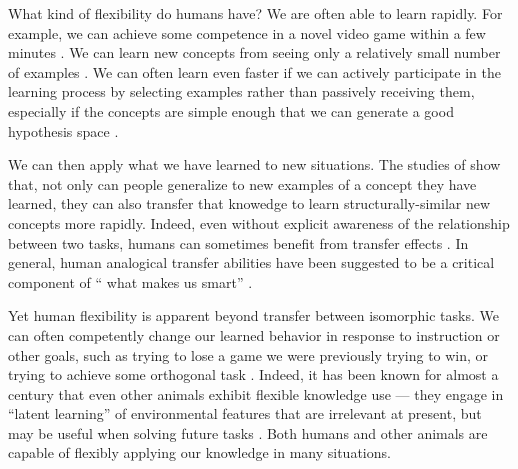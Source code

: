 What kind of flexibility do humans have? We are often able to learn rapidly. For example, we can achieve some competence in a novel video game within a few minutes \citep{Lake2016}. We can learn new concepts from seeing only a relatively small number of examples \citep[e.g.][]{Bourne1970}. We can often learn even faster if we can actively participate in the learning process by selecting examples rather than passively receiving them, especially if the concepts are simple enough that we can generate a good hypothesis space \citep{Markant2014a}. \par
We can then apply what we have learned to new situations. The studies of \citet{Bourne1970} show that, not only can people generalize to new examples of a concept they have learned, they can also transfer that knowedge to learn structurally-similar new concepts more rapidly. Indeed, even without explicit awareness of the relationship between two tasks, humans can sometimes benefit from transfer effects \citep[e.g.][]{Day2011}. In general, human analogical transfer abilities have been suggested to be a critical component of `` what makes us smart'' \citep{Gentner2003}. \par
Yet human flexibility is apparent beyond transfer between isomorphic tasks. We can often competently change our learned behavior in response to instruction or other goals, such as trying to lose a game we were previously trying to win, or trying to achieve some orthogonal task \citep{Lake2016}. Indeed, it has been known for almost a century that even other animals exhibit flexible knowledge use --- they engage in ``latent learning'' of environmental features that are irrelevant at present, but may be useful when solving future tasks \citep{Blodgett1929}. Both humans and other animals are capable of flexibly applying our knowledge in many situations. \par
